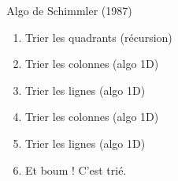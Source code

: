 \documentclass[xcolor={x11names,svgnames}]{beamer}
\begin{document}
\begin{frame}[label=tri_2D]
\begin{columns}
\begin{column}{4.8cm}
    \end{column}
    \begin{column}{6cm}
      
      \begin{block}{Algo de Schimmler (1987)}
        \begin{enumerate}
        \item<2-> Trier les quadrants (récursion)
        \item<4-> Trier les colonnes (algo 1D)
        \item<5-> Trier les lignes (algo 1D)
        \item<6-> Trier les colonnes (algo 1D)
        \item<7-> Trier les lignes (algo 1D)
        \item<8-> Et boum ! C'est trié.
        \end{enumerate}
      \end{block}
    \end{column}
  \end{columns}
\end{frame}


\end{document}
